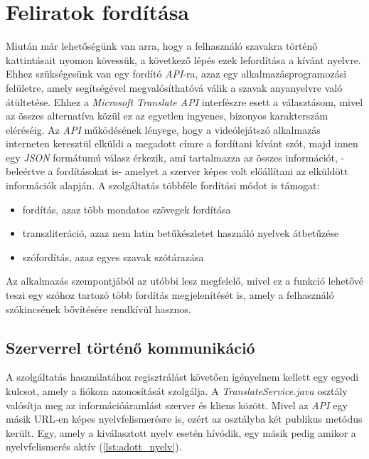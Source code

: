 \section{Feliratok fordítása}

Miután már lehetőségünk van arra, hogy a felhasználó szavakra történő kattintásait nyomon kövessük, a következő lépés ezek lefordítása a kívánt nyelvre. Ehhez szükségesünk van egy fordító \textit{API}-ra, azaz egy alkalmazásprogramozási felületre, amely segítségével megvalósíthatóvá válik a szavak anyanyelvre való átültetése. Ehhez a \textit{Microsoft Translate API} interfészre esett a választásom, mivel az összes alternatíva közül ez az egyetlen ingyenes, bizonyos karakterszám eléréséig. Az \textit{API} működésének lényege, hogy a videólejátszó alkalmazás interneten keresztül elküldi a megadott címre a fordítani kívánt szót, majd innen egy \textit{JSON} formátumú válasz érkezik, ami tartalmazza az összes információt, -beleértve a fordításokat is- amelyet a szerver képes volt előállítani az elküldött információk alapján.
A szolgáltatás többféle fordítási módot is támogat:
\begin{itemize}[noitemsep]
\item fordítás, azaz több mondatos szövegek fordítása
\item transzliteráció, azaz nem latin betűkészletet használó nyelvek átbetűzése
\item szófordítás, azaz egyes szavak szótárazása
\end{itemize}
Az alkalmazás szempontjából az utóbbi lesz megfelelő, mivel ez a funkció lehetővé teszi egy szóhoz tartozó több fordítás megjelenítését is, amely a felhasználó szókincsének bővítésére rendkívül hasznos.

\subsection{Szerverrel történő kommunikáció}
A szolgáltatás használatához regisztrálást követően igényelnem kellett egy egyedi kulcsot, amely a fiókom azonosítását szolgálja. A \textit{TranslateService.java} osztály valósítja meg az információáramlást szerver és kliens között. Mivel az \textit{API} egy másik URL-en képes nyelvfelismerésre is, ezért az osztályba két publikus metódus került. Egy, amely a kiválasztott nyelv esetén hívódik, egy másik pedig amikor a nyelvfelismerés aktív (\ref{lst:adott_nyelv}). 

